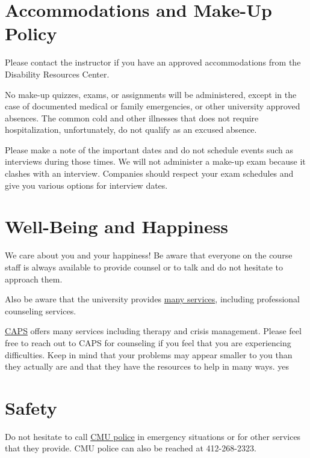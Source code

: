 \section{Accommodations and Make-Up Policy}

\begin{gram}
Please contact the instructor if you have an  approved accommodations from the Disability Resources Center. 

No make-up quizzes, exams, or assignments will be administered, except in the case of documented medical or family emergencies, or other university approved absences. The common cold and other illnesses that does not require hospitalization, unfortunately, do not qualify as an excused absence.

Please make a note of the important dates and do not schedule events such as interviews during those times. We will not administer a make-up exam because it clashes with an interview. Companies should respect your exam schedules and give you various options for interview dates.
\end{gram}
 
\section{Well-Being and Happiness}
\begin{gram}
We care about you and  your happiness! Be aware that everyone on the course staff is always available to provide counsel or to talk and do not hesitate to approach them.

Also be aware that the university provides
%
\href{https://www.cmu.edu/counseling/resources/index.html}{many services},
%
including professional counseling services. 


\href{http://www.cmu.edu/counseling/}{CAPS}
%
offers many services including therapy and crisis management. 
%
Please feel free to reach out to CAPS for counseling if you feel that you are experiencing difficulties.
%
Keep in mind that your problems may appear smaller to you than they actually are and that they have the resources to help in many ways.
yes
 
\end{gram}

\section{Safety}

Do not hesitate to call 
%
\href{http://www.cmu.edu/police/welcome.html}{CMU police}
%
in emergency situations or for other services that they provide.
%
CMU police can also be reached at 412-268-2323.
%
 
